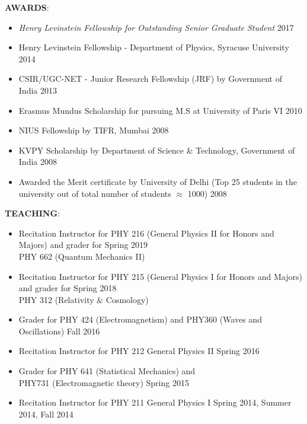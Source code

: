 {\bf AWARDS}:
 \begin{itemize}
 \item \emph{Henry Levinstein Fellowship for Outstanding Senior Graduate Student} \hfill 2017 
\item Henry Levinstein Fellowship - Department of Physics, Syracuse University \hfill 2014
 \item CSIR/UGC-NET - Junior Research Fellowship (JRF) by Government of India \hfill 2013
 \item Erasmus Mundus Scholarship for pursuing M.S at University of Paris VI \hfill 2010
 \item NIUS Fellowship by TIFR, Mumbai \hfill 2008
 \item KVPY Scholarship by Department of Science \& Technology, Government of India \hfill 2008
 \item Awarded the Merit certificate by University of Delhi (Top 25 students in the university out of total number of students $\approx$ 1000) \hfill 2008
 \end{itemize}


{\bf TEACHING}:
 \begin{itemize}
  \item Recitation Instructor for PHY 216 (General Physics II for Honors and Majors) and grader for  \hfill Spring 2019 \\ PHY 662 (Quantum Mechanics II)  \hfill 
  \item Recitation Instructor for PHY 215 (General Physics I for Honors and Majors) and grader for  \hfill Spring 2018 \\ PHY 312 (Relativity \& Cosmology)  \hfill 
 \item Grader for PHY 424 (Electromagnetism) and PHY360 (Waves and Oscillations)  \hfill Fall 2016
 \item Recitation Instructor for PHY 212 General Physics II \hfill Spring 2016
 \item Grader for PHY 641 (Statistical Mechanics) and \\ PHY731 (Electromagnetic theory)  \hfill Spring 2015
 \item Recitation Instructor for PHY 211 General Physics I \hfill Spring 2014, Summer 2014, Fall 2014
 \end{itemize}




